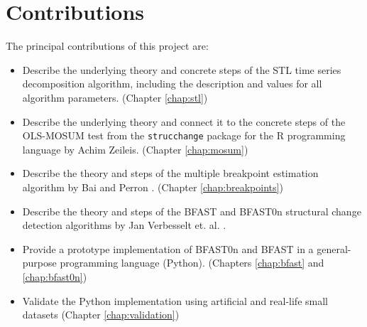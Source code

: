 \documentclass[main.tex]{subfiles}
\begin{document}

\section{Contributions}
\label{sec:contributions}
The principal contributions of this project are: 

\begin{itemize}
\item Describe the underlying theory and concrete steps of the STL time series
  decomposition algorithm, including the description and values for all
  algorithm parameters. (Chapter \ref{chap:stl})
\item Describe the underlying theory and connect it to the concrete steps of
  the OLS-MOSUM test from the \texttt{strucchange} package \cite{strucchange} for the R programming
  language by Achim Zeileis. (Chapter \ref{chap:mosum})
\item Describe the theory and steps of the multiple breakpoint estimation
  algorithm by Bai and Perron \cite{bai_perron}. (Chapter \ref{chap:breakpoints})
\item Describe the theory and steps of the BFAST and BFAST0n structural change
  detection algorithms by Jan Verbesselt et. al. \cite{bfast}.
\item Provide a prototype implementation of BFAST0n and BFAST in a
  general-purpose programming language (Python). (Chapters \ref{chap:bfast} and \ref{chap:bfast0n})
\item Validate the Python implementation using artificial and real-life small
  datasets (Chapter \ref{chap:validation})
\end{itemize}


\biblio
\end{document}
